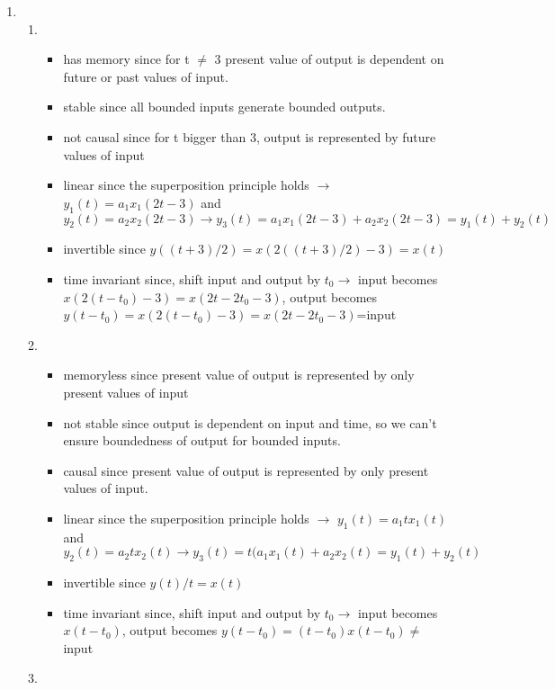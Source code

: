 \documentclass[10pt,a4paper, margin=1in]{article}
\begin{document}
\begin{enumerate}
\newpage
\item 
    \begin{enumerate}
    \item %
        \begin{itemize}
            \item has memory since for t $ \neq$ 3 present value of output is dependent on future or past values of input.
            \item stable since all bounded inputs generate bounded outputs.
            \item not causal since for t bigger than 3, output is represented by future values of input
            \item linear since the superposition principle holds $ \rightarrow{} $
                $y_1(t)=a_1x_1(2t-3)$ and $y_2(t)=a_2x_2(2t-3) \rightarrow{} y_3(t)=a_1x_1(2t-3)+a_2x_2(2t-3)=y_1(t)+y_2(t)$ 
            \item invertible since $y((t+3)/2)=x(2((t+3)/2)-3)=x(t)$
            \item time invariant since, shift input and output by $t_0 \rightarrow{} $ input becomes $x(2(t-t_0)-3)=x(2t-2t_0-3)$, output becomes $y(t-t_0)=x(2(t-t_0)-3)=x(2t-2t_0-3)$=input
        \end{itemize}
    \item %
        \begin{itemize}
            \item memoryless since present value of output is represented by only present values of input
            \item not stable since output is dependent on input and time, so we can't ensure boundedness of output for bounded inputs.
            \item causal since present value of output is represented by only present values of input.
            \item linear since the superposition principle holds $ \rightarrow{} $
                $y_1(t)=a_1tx_1(t)$ and $y_2(t)=a_2tx_2(t) \rightarrow{} y_3(t)=t(a_1x_1(t)+a_2x_2(t)=y_1(t)+y_2(t)$ 
            \item invertible since $y(t)/t=x(t)$
            \item time invariant since, shift input and output by $t_0 \rightarrow{} $ input becomes $x(t-t_0)$, output becomes $y(t-t_0)=(t-t_0)x(t-t_0)\neq$input
        \end{itemize}
    \item %

\end{enumerate}
\end{enumerate}
\end{document}
